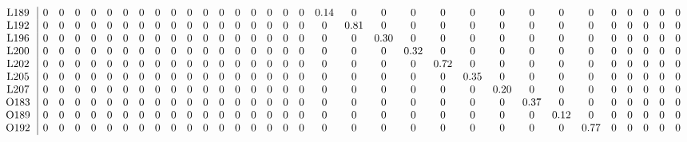 \begin{table}[H]
\begin{center}
\begin{math}
\begin{array}{c|cccccccccccccccccccccccccccccccc}
\mathrm{L189} \hspace*{2pt} &  0 &  0 &  0 &  0 &  0 &  0 &  0 &  0 &  0 &  0 &  0 &  0 &  0 &  0 &  0 &  0 &  0 &       0.14 &  0 &  0 &  0 &  0 &  0 &  0 &  0 &  0 &  0 &  0 &  0 &  0 &  0 &  0 \\
\mathrm{L192} \hspace*{2pt} &  0 &  0 &  0 &  0 &  0 &  0 &  0 &  0 &  0 &  0 &  0 &  0 &  0 &  0 &  0 &  0 &  0 &  0 &       0.81 &  0 &  0 &  0 &  0 &  0 &  0 &  0 &  0 &  0 &  0 &  0 &  0 &  0 \\
\mathrm{L196} \hspace*{2pt} &  0 &  0 &  0 &  0 &  0 &  0 &  0 &  0 &  0 &  0 &  0 &  0 &  0 &  0 &  0 &  0 &  0 &  0 &  0 &       0.30 &  0 &  0 &  0 &  0 &  0 &  0 &  0 &  0 &  0 &  0 &  0 &  0 \\
\mathrm{L200} \hspace*{2pt} &  0 &  0 &  0 &  0 &  0 &  0 &  0 &  0 &  0 &  0 &  0 &  0 &  0 &  0 &  0 &  0 &  0 &  0 &  0 &  0 &       0.32 &  0 &  0 &  0 &  0 &  0 &  0 &  0 &  0 &  0 &  0 &  0 \\
\mathrm{L202} \hspace*{2pt} &  0 &  0 &  0 &  0 &  0 &  0 &  0 &  0 &  0 &  0 &  0 &  0 &  0 &  0 &  0 &  0 &  0 &  0 &  0 &  0 &  0 &       0.72 &  0 &  0 &  0 &  0 &  0 &  0 &  0 &  0 &  0 &  0 \\
\mathrm{L205} \hspace*{2pt} &  0 &  0 &  0 &  0 &  0 &  0 &  0 &  0 &  0 &  0 &  0 &  0 &  0 &  0 &  0 &  0 &  0 &  0 &  0 &  0 &  0 &  0 &       0.35 &  0 &  0 &  0 &  0 &  0 &  0 &  0 &  0 &  0 \\
\mathrm{L207} \hspace*{2pt} &  0 &  0 &  0 &  0 &  0 &  0 &  0 &  0 &  0 &  0 &  0 &  0 &  0 &  0 &  0 &  0 &  0 &  0 &  0 &  0 &  0 &  0 &  0 &       0.20 &  0 &  0 &  0 &  0 &  0 &  0 &  0 &  0 \\
\mathrm{O183} \hspace*{2pt} &  0 &  0 &  0 &  0 &  0 &  0 &  0 &  0 &  0 &  0 &  0 &  0 &  0 &  0 &  0 &  0 &  0 &  0 &  0 &  0 &  0 &  0 &  0 &  0 &       0.37 &  0 &  0 &  0 &  0 &  0 &  0 &  0 \\
\mathrm{O189} \hspace*{2pt} &  0 &  0 &  0 &  0 &  0 &  0 &  0 &  0 &  0 &  0 &  0 &  0 &  0 &  0 &  0 &  0 &  0 &  0 &  0 &  0 &  0 &  0 &  0 &  0 &  0 &       0.12 &  0 &  0 &  0 &  0 &  0 &  0 \\
\mathrm{O192} \hspace*{2pt} &  0 &  0 &  0 &  0 &  0 &  0 &  0 &  0 &  0 &  0 &  0 &  0 &  0 &  0 &  0 &  0 &  0 &  0 &  0 &  0 &  0 &  0 &  0 &  0 &  0 &  0 &       0.77 &  0 &  0 &  0 &  0 &  0 \\

\end{array}
\end{math}
\end{center}
\end{table}
